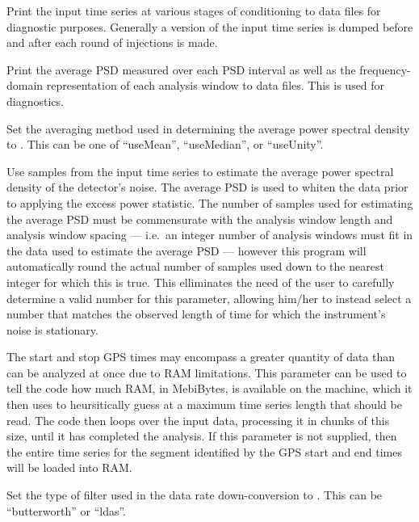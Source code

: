 \begin{entry}
\begin{entry}
\item[\option{--printData}]
Print the input time series at various stages of conditioning to data files
for diagnostic purposes.  Generally a version of the input time series is
dumped before and after each round of injections is made.

\item[\option{--printSpectrum}]
Print the average PSD measured over each PSD interval as well as the
frequency-domain representation of each analysis window to data files.
This is used for diagnostics.

\item[\option{--psd-average-method} \parm{method}]
Set the averaging method used in determining the average power spectral
density to .  This can be one of ``useMean'', ``useMedian'',
or ``useUnity''.

\item[\option{--psd-average-points} \parm{samples}]
Use  samples from the input time series to estimate the
average power spectral density of the detector's noise.  The average PSD is
used to whiten the data prior to applying the excess power statistic.  The
number of samples used for estimating the average PSD must be commensurate
with the analysis window length and analysis window spacing --- i.e.\ an
integer number of analysis windows must fit in the data used to estimate
the average PSD --- however this program will automatically round the
actual number of samples used down to the nearest integer for which this is
true.  This elliminates the need of the user to carefully determine a valid
number for this parameter, allowing him/her to instead select a number that
matches the observed length of time for which the instrument's noise is
stationary.

\item[\option{--ram-limit} \parm{MebiBytes}]
The start and stop GPS times may encompass a greater quantity of data than
can be analyzed at once due to RAM limitations.  This parameter can be used
to tell the code how much RAM, in MebiBytes, is available on the machine,
which it then uses to heursitically guess at a maximum time series length
that should be read.  The code then loops over the input data, processing
it in chunks of this size, until it has completed the analysis.  If this
parameter is not supplied, then the entire time series for the segment
identified by the GPS start and end times will be loaded into RAM.

\item[\option{--resample-filter} \parm{filter type}]
Set the type of filter used in the data rate down-conversion to
.  This can be ``butterworth'' or ``ldas''.


\end{entry}
\end{entry}
